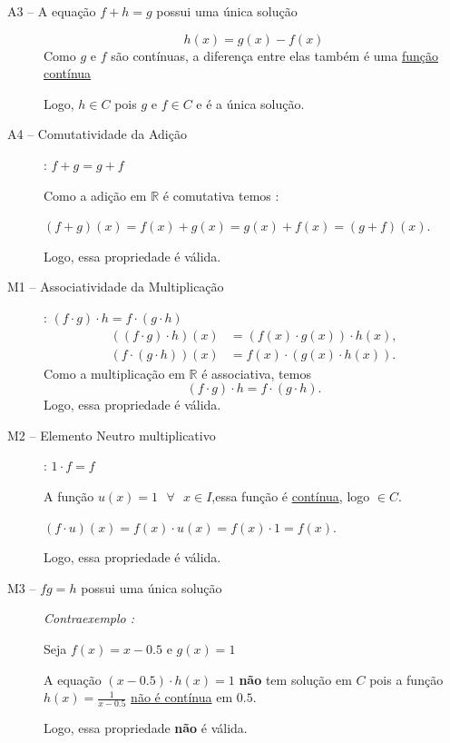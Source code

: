 \documentclass[a4paper,12pt]{article}
\begin{document}
\begin{enumerate}[label=1.\arabic*.]
\begin{description}
      \item[A3 -- A equação $f + h = g$ possui uma única solução]  
      
      \[
        h(x) = g(x) - f(x)
      \]
      Como $g$ e $f$ são contínuas, a diferença entre elas também é uma \underline{função contínua}
      
      Logo, $h \in C$ pois $g$ e $f \in C$ e é a única solução.

      \item[A4 -- Comutatividade da Adição] : $f + g = g + f$  

        Como a adição em $\mathbb{R}$ é comutativa temos :

        $(f+g)(x) = f(x)+g(x) = g(x)+f(x) = (g+f)(x)$.
      
        Logo, essa propriedade é válida. 

      \item[M1 -- Associatividade da Multiplicação] : $(f \cdot g) \cdot h = f \cdot (g \cdot h)$  
      \begin{align*}
        ((f \cdot g) \cdot h)(x) &= (f(x) \cdot g(x)) \cdot h(x), \\
        (f \cdot (g \cdot h))(x) &= f(x) \cdot (g(x) \cdot h(x)).
      \end{align*}
      Como a multiplicação em $\mathbb{R}$ é associativa, temos
      \[
      (f \cdot g) \cdot h = f \cdot (g \cdot h).
      \]
      Logo, essa propriedade é válida.

      \item[M2 -- Elemento Neutro multiplicativo] : $1 \cdot f = f$
      
      A função $u(x) = 1 \text{ } \forall \text{ } x \in I$,essa função é \underline{contínua}, logo $\in C$. 
      
      $(f \cdot u)(x) = f(x) \cdot u(x) = f(x)\cdot 1 = f(x)$.

      Logo, essa propriedade é válida.
      
      \item[M3 -- $fg =h$ possui uma única solução]
      
      \textit{Contraexemplo : }

      Seja $f(x) = x - 0.5 \text{ e } g(x) = 1$

      A equação $(x - 0.5) \cdot h(x) = 1$ \textbf{não} tem solução em $C$ pois a função $h(x) = \frac{1}{x - 0.5}$ 
      \underline{não é contínua} em $0.5$.

      Logo, essa propriedade \textbf{não} é válida.


\end{description}
\end{enumerate}
\end{document}
